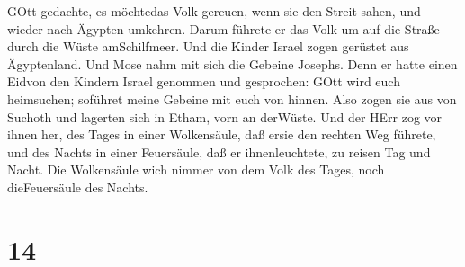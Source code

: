 GOtt gedachte, es möchtedas Volk gereuen, wenn sie den Streit sahen, und
wieder nach Ägypten umkehren.  Darum führete er das Volk um
auf die Straße durch die Wüste amSchilfmeer. Und die Kinder Israel zogen
gerüstet aus Ägyptenland.  Und Mose nahm mit sich die
Gebeine Josephs. Denn er hatte einen Eidvon den Kindern Israel genommen
und gesprochen: GOtt wird euch heimsuchen; soführet meine Gebeine mit
euch von hinnen.  Also zogen sie aus von Suchoth und
lagerten sich in Etham, vorn an derWüste.  Und der HErr zog
vor ihnen her, des Tages in einer Wolkensäule, daß ersie den rechten Weg
führete, und des Nachts in einer Feuersäule, daß er ihnenleuchtete, zu
reisen Tag und Nacht.  Die Wolkensäule wich nimmer von dem
Volk des Tages, noch dieFeuersäule des Nachts.

\hypertarget{section-13}{%
\section{14}\label{section-13}}

